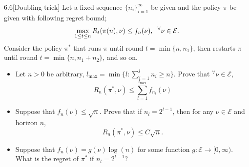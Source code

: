 \documentclass[10pt]{article}
\theoremstyle{definition}
\newenvironment{exercise*}[1]{%
  \IfBlankTF{#1}
    {\renewcommand{\themanualexerciseinner}{\unskip}}
    {\renewcommand\themanualexerciseinner{#1}}%
  \manualexerciseinner
}{\endmanualexerciseinner}
\begin{document}
\begin{exercise*}{6.6}[Doubling trick]
    Let a fixed sequence $\{n_i\}_{i=1}^{\infty}$ be given and the policy $\pi$ be given with following regret bound;
    \begin{equation*}
        \max_{1 \leq t \leq n} R_t(\pi(n), \nu) \leq f_n(\nu), \hspace{0.2cm} ^\forall \nu \in \mathcal{E}.
    \end{equation*}
    Consider the policy $\pi^*$ that runs $\pi$ until round $t = \min\{n,n_1\}$, then restarts $\pi$ until round $t = \min\{n,n_1 + n_2\}$, and so on.
    \begin{itemize}
        \item[(a)] Let $n > 0$ be arbitrary, $l_{\max} = \min\{l : \sum_{i=1}^l n_i \geq n\}$. 
        Prove that $^\forall \nu \in \mathcal{E}$, 
        \begin{equation*}
            R_n(\pi^*, \nu) \leq \sum_{l=1}^{l_{\max}} f_{n_l} (\nu)
        \end{equation*}
        \item[(b)] Suppose that $f_n (\nu) \leq \sqrt{n}$.
        Prove that if $n_l = 2^{l-1}$, then for any $\nu \in \mathcal{E}$ and horizon $n$,
        \begin{equation*}
            R_n (\pi^*, \nu) \leq C \sqrt{n}.
        \end{equation*}
        \item[(c)] Suppose that $f_n (\nu) = g(\nu)\log(n)$ for some function $g : \mathcal{E} \to [0, \infty)$.
        What is the regret of $\pi^*$ if $n_l = 2^{l-1}$?
    \end{itemize}
\end{exercise*}
\end{document}
